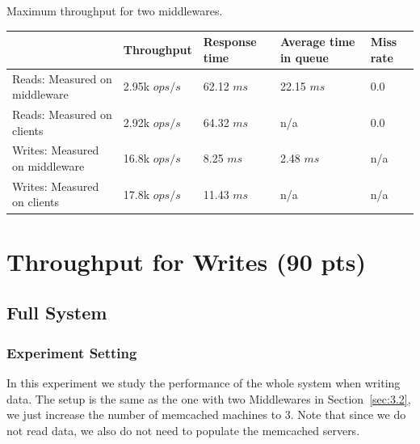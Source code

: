 \documentclass[11pt,a4paper]{article}
\begin{document}
\begin{center}
	{Maximum throughput for two middlewares.}
	\begin{tabular}{|l|p{2cm}|p{2cm}|p{2cm}|p{2cm}|}
		\hline                                & Throughput & Response time & Average time in queue & Miss rate \\ 
		\hline Reads: Measured on middleware  & 2.95k $ops/s$ & 62.12 $ms$ & 22.15 $ms$            & 0.0       \\ 
		\hline Reads: Measured on clients     & 2.92k $ops/s$ & 64.32 $ms$ & n/a                   & 0.0       \\ 
		\hline Writes: Measured on middleware & 16.8k $ops/s$ & 8.25 $ms$ & 2.48 $ms$             & n/a       \\ 
        \hline Writes: Measured on clients    & 17.8k $ops/s$ & 11.43 $ms$ & n/a                   & n/a       \\ 
		\hline 
	\end{tabular}
\end{center}

\section{Throughput for Writes (90 pts)}
\label{sec:4.1}

\subsection{Full System}

\subsubsection*{Experiment Setting}

In this experiment we study the performance of the whole system when writing data.
The setup is the same as the one with two Middlewares in Section~\ref{sec:3.2}, we just increase the number of memcached machines to 3. Note that since we do not read data, we also do not need to populate the memcached servers.
\end{document}
